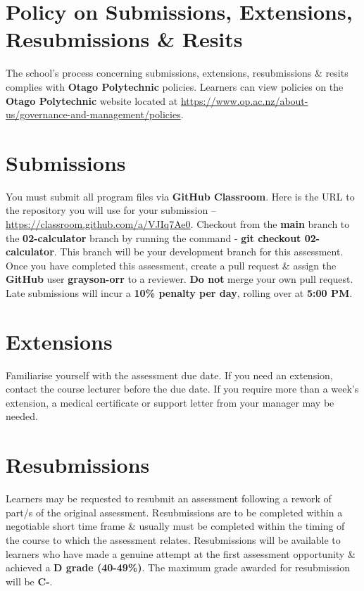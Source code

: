\documentclass{article}
\begin{document}
\section*{Policy on Submissions, Extensions, Resubmissions \& Resits}
The school's process concerning submissions, extensions, resubmissions \& resits complies with \textbf{Otago Polytechnic} policies. Learners can view policies on the \textbf{Otago Polytechnic} website located at \href{https://www.op.ac.nz/about-us/governance-and-management/policies}{https://www.op.ac.nz/about-us/governance-and-management/policies}.

\section*{Submissions}
You must submit all program files via \textbf{GitHub Classroom}. Here is the URL to the repository you will use for your submission – \href{https://classroom.github.com/a/VJIq7Ae0}{https://classroom.github.com/a/VJIq7Ae0}. Checkout from the \textbf{main} branch to the \textbf{02-calculator} branch by running the command - \textbf{git checkout 02-calculator}. This branch will be your development branch for this assessment. Once you have completed this assessment, create a pull request \& assign the \textbf{GitHub} user \textbf{grayson-orr} to a reviewer. \textbf{Do not} merge your own pull request. Late submissions will incur a \textbf{10\% penalty per day}, rolling over at \textbf{5:00 PM}.

\section*{Extensions}
Familiarise yourself with the assessment due date. If you need an extension, contact the course lecturer before the due date. If you require more than a week's extension, a medical certificate or support letter from your manager may be needed.

\section*{Resubmissions}
Learners may be requested to resubmit an assessment following a rework of part/s of the original assessment. Resubmissions are to be completed within a negotiable short time frame \& usually must be completed within the timing of the course to which the assessment relates. Resubmissions will be available to learners who have made a genuine attempt at the first assessment opportunity \& achieved a \textbf{D grade (40-49\%)}. The maximum grade awarded for resubmission will be \textbf{C-}.
\end{document}
